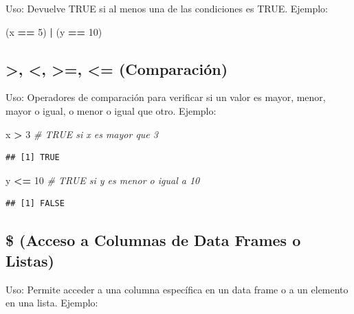 \documentclass[
]{book}
\newenvironment{Shaded}{\begin{snugshade}}{\end{snugshade}}
\newcommand{\AttributeTok}[1]{\textcolor[rgb]{0.13,0.29,0.53}{#1}}
\newcommand{\CommentTok}[1]{\textcolor[rgb]{0.56,0.35,0.01}{\textit{#1}}}
\newcommand{\DecValTok}[1]{\textcolor[rgb]{0.00,0.00,0.81}{#1}}
\newcommand{\FunctionTok}[1]{\textcolor[rgb]{0.13,0.29,0.53}{\textbf{#1}}}
\newcommand{\NormalTok}[1]{#1}
\newcommand{\OtherTok}[1]{\textcolor[rgb]{0.56,0.35,0.01}{#1}}
\newcommand{\SpecialCharTok}[1]{\textcolor[rgb]{0.81,0.36,0.00}{\textbf{#1}}}
\begin{document}
Uso: Devuelve TRUE si al menos una de las condiciones es TRUE.
Ejemplo:

\begin{Shaded}
\begin{Highlighting}[]
\NormalTok{(x }\SpecialCharTok{==} \DecValTok{5}\NormalTok{) }\SpecialCharTok{|}\NormalTok{ (y }\SpecialCharTok{==} \DecValTok{10}\NormalTok{)}
\end{Highlighting}
\end{Shaded}

\hypertarget{comparaciuxf3n}{%
\subsection{\textgreater, \textless, \textgreater=, \textless= (Comparación)}\label{comparaciuxf3n}}

Uso: Operadores de comparación para verificar si un valor es mayor, menor, mayor o igual, o menor o igual que otro.
Ejemplo:

\begin{Shaded}
\begin{Highlighting}[]
\NormalTok{x }\SpecialCharTok{\textgreater{}} \DecValTok{3}   \CommentTok{\# TRUE si x es mayor que 3}
\end{Highlighting}
\end{Shaded}

\begin{verbatim}
## [1] TRUE
\end{verbatim}

\begin{Shaded}
\begin{Highlighting}[]
\NormalTok{y }\SpecialCharTok{\textless{}=} \DecValTok{10} \CommentTok{\# TRUE si y es menor o igual a 10}
\end{Highlighting}
\end{Shaded}

\begin{verbatim}
## [1] FALSE
\end{verbatim}

\hypertarget{acceso}{%
\subsection{\$ (Acceso a Columnas de Data Frames o Listas)}\label{acceso}}

Uso: Permite acceder a una columna específica en un data frame o a un elemento en una lista.
Ejemplo:

\begin{Shaded}
\end{Shaded}
\end{document}
